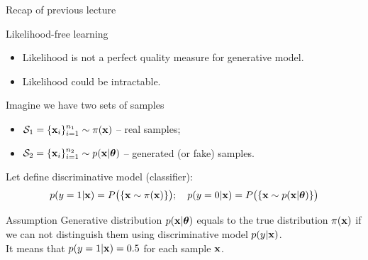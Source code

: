 
\usepackage{tikz}

\usetikzlibrary{arrows,shapes,positioning,shadows,trees}

\begin{frame}
\titlepage
\end{frame}
\begin{frame}{Recap of previous lecture}
	\begin{block}{Likelihood-free learning}
		\begin{itemize}
			\item Likelihood is not a perfect quality measure for generative model.
			\item Likelihood could be intractable.
		\end{itemize}
	\end{block}
	Imagine we have two sets of samples 
	\begin{itemize}
		\item $\mathcal{S}_1 = \{\mathbf{x}_i\}_{i=1}^{n_1} \sim \pi(\mathbf{x})$ -- real samples;
		\item $\mathcal{S}_2 = \{\mathbf{x}_i\}_{i=1}^{n_2} \sim p(\mathbf{x} | \boldsymbol{\theta})$ -- generated (or fake) samples.
	\end{itemize}
	Let define discriminative model (classifier):
	\[
		p(y = 1 | \mathbf{x}) = P\bigl(\{\mathbf{x} \sim \pi(\mathbf{x})\}\bigr); \quad p(y = 0 | \mathbf{x}) = P\bigl(\{\mathbf{x} \sim p(\mathbf{x} | \boldsymbol{\theta})\}\bigr)
	\]
	\vspace{-0.5cm}
	\begin{block}{Assumption}
		Generative distribution $p(\mathbf{x} | \boldsymbol{\theta})$ equals to the true distribution $\pi(\mathbf{x})$ if we can not distinguish them using discriminative model $p(y | \mathbf{x})$. \\
		It means that $p(y = 1 | \mathbf{x}) = 0.5$ for each sample $\mathbf{x}$.
	\end{block}
\end{frame}
